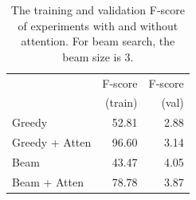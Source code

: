 \documentclass[11pt,a4paper]{article}
\begin{document}
\begin{table}[ht]
\centering
\caption{The training and validation F-score of experiments with and without attention. For beam search, the beam size is 3.}
\label{tab:atten}
\begin{tabular}{lrr}
\toprule
                  & F-score  & F-score    \\
                  & (train)  & (val)    \\ \midrule
Greedy          & 52.81            & 2.88                    \\
Greedy + Atten  & 96.60            & 3.14                    \\ 
Beam              & 43.47            & 4.05                    \\
Beam + Atten          & 78.78            & 3.87               \\ \bottomrule
\end{tabular}
\end{table}
\end{document}
